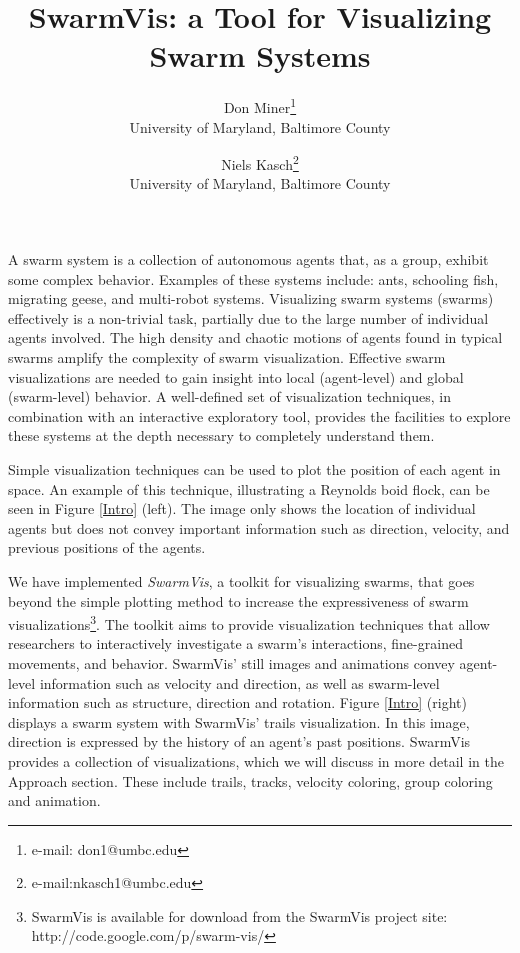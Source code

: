 \documentclass{vgtc}
\title{SwarmVis: a Tool for Visualizing Swarm Systems}
\author{Don Miner\thanks{e-mail: don1@umbc.edu}\\ %
        \scriptsize University of Maryland, Baltimore County %
\and Niels Kasch\thanks{e-mail:nkasch1@umbc.edu}\\ %
     \scriptsize University of Maryland, Baltimore County %
}
\begin{document}

\maketitle



A swarm system is a collection of autonomous agents that, as a group, exhibit some complex behavior.
Examples of these systems include: ants\cite{couzin2003sol}, schooling fish\cite{parrish2002sof}, migrating geese\cite{reynolds1987}, 
and multi-robot systems\cite{mondada2004sbn}\cite{mclurkin2004srt}.
Visualizing swarm systems (swarms) effectively is a non-trivial task, partially due to the large number of individual agents involved.
The high density and chaotic motions of agents found in typical swarms amplify the complexity of swarm visualization.
Effective swarm visualizations are needed to gain insight into local (agent-level) and global (swarm-level) behavior.
A well-defined set of visualization techniques, in combination with an interactive exploratory tool,
provides the facilities to explore these systems at the depth necessary to completely understand them.


Simple visualization techniques can be used to plot the position of each agent in space.
An example of this technique, illustrating a Reynolds boid flock\cite{reynolds1987}, can be seen in Figure \ref{Intro} (left).
The image only shows the location of individual agents but does not convey important
information such as direction, velocity, and previous positions of the agents.

We have implemented \textit{SwarmVis}, a toolkit for visualizing swarms,
that goes beyond the simple plotting method to increase the
expressiveness of swarm visualizations\footnote{SwarmVis is available for download from the SwarmVis project site: http://code.google.com/p/swarm-vis/}.
The toolkit aims to provide visualization techniques that allow researchers to interactively
investigate a swarm's interactions, fine-grained movements, and behavior.
SwarmVis' still images and animations convey agent-level information such as velocity and direction, as well as swarm-level information such as
structure, direction and rotation.
Figure \ref{Intro} (right) displays a swarm system with SwarmVis' trails visualization.
In this image, direction is expressed by the history of an agent's past positions.
SwarmVis provides a collection of visualizations, which we will discuss in more detail in the Approach section. These include
trails, tracks, velocity coloring, group coloring and animation.
\end{document}
